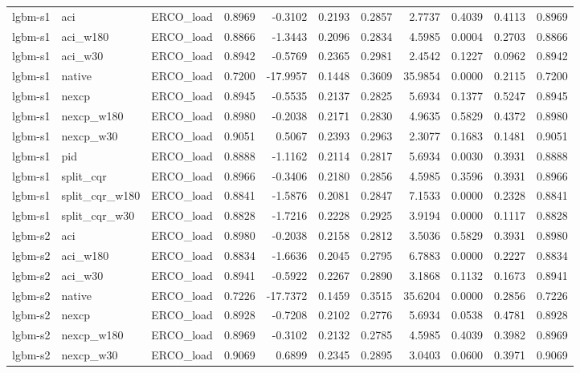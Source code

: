 \begin{tabular}{lllrrrrrrrr}
lgbm-s1 & aci & ERCO_load & 0.8969 & -0.3102 & 0.2193 & 0.2857 & 2.7737 & 0.4039 & 0.4113 & 0.8969 \\
lgbm-s1 & aci_w180 & ERCO_load & 0.8866 & -1.3443 & 0.2096 & 0.2834 & 4.5985 & 0.0004 & 0.2703 & 0.8866 \\
lgbm-s1 & aci_w30 & ERCO_load & 0.8942 & -0.5769 & 0.2365 & 0.2981 & 2.4542 & 0.1227 & 0.0962 & 0.8942 \\
lgbm-s1 & native & ERCO_load & 0.7200 & -17.9957 & 0.1448 & 0.3609 & 35.9854 & 0.0000 & 0.2115 & 0.7200 \\
lgbm-s1 & nexcp & ERCO_load & 0.8945 & -0.5535 & 0.2137 & 0.2825 & 5.6934 & 0.1377 & 0.5247 & 0.8945 \\
lgbm-s1 & nexcp_w180 & ERCO_load & 0.8980 & -0.2038 & 0.2171 & 0.2830 & 4.9635 & 0.5829 & 0.4372 & 0.8980 \\
lgbm-s1 & nexcp_w30 & ERCO_load & 0.9051 & 0.5067 & 0.2393 & 0.2963 & 2.3077 & 0.1683 & 0.1481 & 0.9051 \\
lgbm-s1 & pid & ERCO_load & 0.8888 & -1.1162 & 0.2114 & 0.2817 & 5.6934 & 0.0030 & 0.3931 & 0.8888 \\
lgbm-s1 & split_cqr & ERCO_load & 0.8966 & -0.3406 & 0.2180 & 0.2856 & 4.5985 & 0.3596 & 0.3931 & 0.8966 \\
lgbm-s1 & split_cqr_w180 & ERCO_load & 0.8841 & -1.5876 & 0.2081 & 0.2847 & 7.1533 & 0.0000 & 0.2328 & 0.8841 \\
lgbm-s1 & split_cqr_w30 & ERCO_load & 0.8828 & -1.7216 & 0.2228 & 0.2925 & 3.9194 & 0.0000 & 0.1117 & 0.8828 \\
lgbm-s2 & aci & ERCO_load & 0.8980 & -0.2038 & 0.2158 & 0.2812 & 3.5036 & 0.5829 & 0.3931 & 0.8980 \\
lgbm-s2 & aci_w180 & ERCO_load & 0.8834 & -1.6636 & 0.2045 & 0.2795 & 6.7883 & 0.0000 & 0.2227 & 0.8834 \\
lgbm-s2 & aci_w30 & ERCO_load & 0.8941 & -0.5922 & 0.2267 & 0.2890 & 3.1868 & 0.1132 & 0.1673 & 0.8941 \\
lgbm-s2 & native & ERCO_load & 0.7226 & -17.7372 & 0.1459 & 0.3515 & 35.6204 & 0.0000 & 0.2856 & 0.7226 \\
lgbm-s2 & nexcp & ERCO_load & 0.8928 & -0.7208 & 0.2102 & 0.2776 & 5.6934 & 0.0538 & 0.4781 & 0.8928 \\
lgbm-s2 & nexcp_w180 & ERCO_load & 0.8969 & -0.3102 & 0.2132 & 0.2785 & 4.5985 & 0.4039 & 0.3982 & 0.8969 \\
lgbm-s2 & nexcp_w30 & ERCO_load & 0.9069 & 0.6899 & 0.2345 & 0.2895 & 3.0403 & 0.0600 & 0.3971 & 0.9069 \\

\end{tabular}
